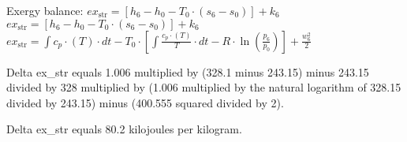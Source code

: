 Exergy balance:  
\( ex_{\text{str}} = [h_6 - h_0 - T_0 \cdot (s_6 - s_0)] + k_6 \)  
\( ex_{\text{str}} = [h_6 - h_0 - T_0 \cdot (s_6 - s_0)] + k_6 \)  
\( ex_{\text{str}} = \int c_p \cdot (T) \cdot dt - T_0 \cdot \left[ \int \frac{c_p \cdot (T)}{T} \cdot dt - R \cdot \ln \left( \frac{p_6}{p_0} \right) \right] + \frac{w_6^2}{2} \)

Delta ex_str equals 1.006 multiplied by (328.1 minus 243.15) minus 243.15 divided by 328 multiplied by (1.006 multiplied by the natural logarithm of 328.15 divided by 243.15) minus (400.555 squared divided by 2).  

Delta ex_str equals 80.2 kilojoules per kilogram.